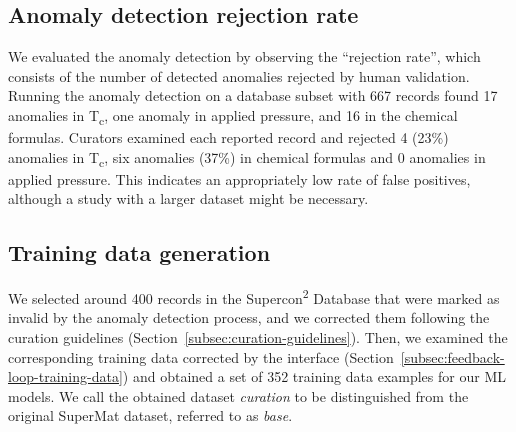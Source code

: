 \subsection{Anomaly detection rejection rate}
\label{subsec:anomaly-detection-evaluation}

We evaluated the anomaly detection by observing the ``rejection rate'', which consists of the number of detected anomalies rejected by human validation. 
Running the anomaly detection on a database subset with 667 records found 17 anomalies in T\textsubscript{c}, one anomaly in applied pressure, and 16 in the chemical formulas. 
Curators examined each reported record and rejected 4 (23\%) anomalies in T\textsubscript{c}, six anomalies (37\%) in chemical formulas and 0 anomalies in applied pressure. 
This indicates an appropriately low rate of false positives, although a study with a larger dataset might be necessary. 

\subsection{Training data generation}
\label{subsec:training-data-generation-evaluation}
We selected around 400 records in the Supercon\textsuperscript{2} Database that were marked as invalid by the anomaly detection process, and we corrected them following the curation guidelines (Section~\ref{subsec:curation-guidelines}).
Then, we examined the corresponding training data corrected by the interface (Section~\ref{subsec:feedback-loop-training-data}) and obtained a set of 352 training data examples for our ML models. 
We call the obtained dataset \emph{curation} to be distinguished from the original SuperMat dataset, referred to as \emph{base}.

